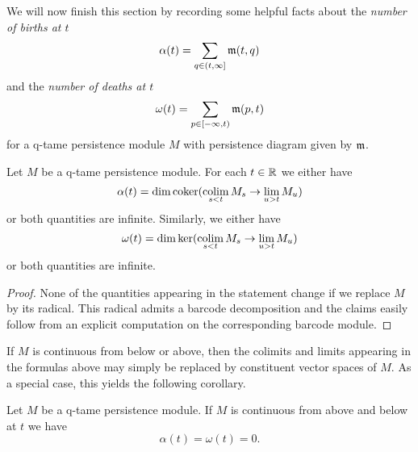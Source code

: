 We will now finish this section by recording some helpful facts about the \emph{number of births at $t$}
\[
	\alpha(t) = \sum_{q \in (t, \infty]} \mathfrak{m}(t,q)
\]
and the \emph{number of deaths at $t$}
\[
	\omega(t) = \sum_{p \in [-\infty, t)} \mathfrak{m}(p,t)
\]
for a q-tame persistence module $M$ with persistence diagram given by $\mathfrak{m}$.


\begin{lem}
\label{lem:birth_death_formulas}
	Let $M$ be a q-tame persistence module.
	For each $t \in \mathbb{R}$ we either have 
	\[
		\alpha(t) = \dim \operatorname{coker} (\operatorname*{colim}_{s < t} M_{s} \to \lim_{u > t} M_{u})
	\]
	or both quantities are infinite.
	Similarly, we either have 
	\[
		\omega(t) = \dim \ker (\operatorname*{colim}_{s < t} M_{s} \to \lim_{u > t} M_{u})
	\]
	or both quantities are infinite.
\end{lem}
\begin{proof}
	None of the quantities appearing in the statement change if we replace $M$ by its radical.
	This radical admits a barcode decomposition and the claims easily follow from an explicit computation on the corresponding barcode module.
\end{proof}

If $M$ is continuous from below or above, then the colimits and limits appearing in the formulas above may simply be replaced by constituent vector spaces of $M$. 
As a special case, this yields the following corollary.

\begin{cor}
\label{cor:regular_value_no_endpoint}
	Let $M$ be a q-tame persistence module.
	If $M$ is continuous from above and below at $t$ we have
	\[
		\alpha(t) = \omega(t) = 0.
	\]
\end{cor}



